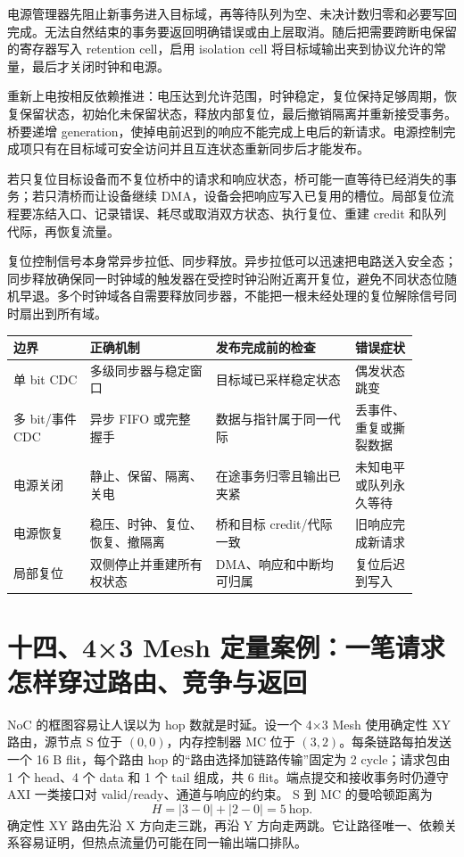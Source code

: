 
电源管理器先阻止新事务进入目标域，再等待队列为空、未决计数归零和必要写回完成。无法自然结束的事务要返回明确错误或由上层取消。随后把需要跨断电保留的寄存器写入 retention cell，启用 isolation cell 将目标域输出夹到协议允许的常量，最后才关闭时钟和电源。

重新上电按相反依赖推进：电压达到允许范围，时钟稳定，复位保持足够周期，恢复保留状态，初始化未保留状态，释放内部复位，最后撤销隔离并重新接受事务。桥要递增 generation，使掉电前迟到的响应不能完成上电后的新请求。电源控制完成项只有在目标域可安全访问并且互连状态重新同步后才能发布。


若只复位目标设备而不复位桥中的请求和响应状态，桥可能一直等待已经消失的事务；若只清桥而让设备继续 DMA，设备会把响应写入已复用的槽位。局部复位流程要冻结入口、记录错误、耗尽或取消双方状态、执行复位、重建 credit 和队列代际，再恢复流量。

复位控制信号本身常异步拉低、同步释放。异步拉低可以迅速把电路送入安全态；同步释放确保同一时钟域的触发器在受控时钟沿附近离开复位，避免不同状态位随机早退。多个时钟域各自需要释放同步器，不能把一根未经处理的复位解除信号同时扇出到所有域。

\begin{longtable}{L{0.17\linewidth}L{0.28\linewidth}L{0.31\linewidth}L{0.14\linewidth}}
\toprule
边界 & 正确机制 & 发布完成前的检查 & 错误症状 \\
\midrule
单 bit CDC & 多级同步器与稳定窗口 & 目标域已采样稳定状态 & 偶发状态跳变 \\\tablerowrule
多 bit/事件 CDC & 异步 FIFO 或完整握手 & 数据与指针属于同一代际 & 丢事件、重复或撕裂数据 \\\tablerowrule
电源关闭 & 静止、保留、隔离、关电 & 在途事务归零且输出已夹紧 & 未知电平或队列永久等待 \\\tablerowrule
电源恢复 & 稳压、时钟、复位、恢复、撤隔离 & 桥和目标 credit/代际一致 & 旧响应完成新请求 \\\tablerowrule
局部复位 & 双侧停止并重建所有权状态 & DMA、响应和中断均可归属 & 复位后迟到写入 \\
\bottomrule
\end{longtable}
\section{十四、4×3 Mesh 定量案例：一笔请求怎样穿过路由、竞争与返回}

NoC 的框图容易让人误以为 hop 数就是时延。设一个 4×3 Mesh 使用确定性 XY 路由，源节点 S 位于 $(0,0)$，内存控制器 MC 位于 $(3,2)$。每条链路每拍发送一个 16 B flit，每个路由 hop 的“路由选择加链路传输”固定为 2 cycle；请求包由 1 个 head、4 个 data 和 1 个 tail 组成，共 6 flit。端点提交和接收事务时仍遵守 AXI 一类接口对 valid/ready、通道与响应的约束。\cite{arm-amba-axi} S 到 MC 的曼哈顿距离为
\[
H=|3-0|+|2-0|=5\ \text{hop}.
\]
确定性 XY 路由先沿 X 方向走三跳，再沿 Y 方向走两跳。它让路径唯一、依赖关系容易证明，但热点流量仍可能在同一输出端口排队。

